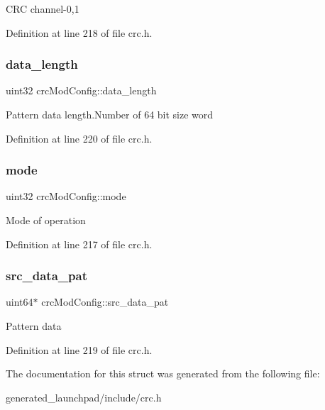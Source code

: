 C\+RC channel-\/0,1 

Definition at line 218 of file crc.\+h.

\mbox{\label{structcrcModConfig_a2893c12aac06a9a7b1d66707df02b6fc}} 
\subsubsection{\texorpdfstring{data\+\_\+length}{data\_length}}
{\footnotesize\ttfamily uint32 crc\+Mod\+Config\+::data\+\_\+length}

Pattern data length.\+Number of 64 bit size word 

Definition at line 220 of file crc.\+h.

\mbox{\label{structcrcModConfig_a58a902f65ab46af3bb418a9331844895}} 
\subsubsection{\texorpdfstring{mode}{mode}}
{\footnotesize\ttfamily uint32 crc\+Mod\+Config\+::mode}

Mode of operation 

Definition at line 217 of file crc.\+h.

\mbox{\label{structcrcModConfig_afb9475d84a6a2522c47d3fbf73deb331}} 
\subsubsection{\texorpdfstring{src\+\_\+data\+\_\+pat}{src\_data\_pat}}
{\footnotesize\ttfamily uint64$\ast$ crc\+Mod\+Config\+::src\+\_\+data\+\_\+pat}

Pattern data 

Definition at line 219 of file crc.\+h.



The documentation for this struct was generated from the following file\+:\begin{DoxyCompactItemize}
\item 
generated\+\_\+launchpad/include/crc.\+h\end{DoxyCompactItemize}
